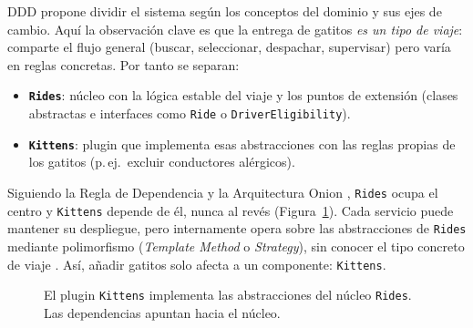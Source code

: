 DDD propone dividir el sistema según los conceptos del dominio y sus ejes de
cambio. Aquí la observación clave es que la entrega de gatitos \emph{es un tipo
de viaje}: comparte el flujo general (buscar, seleccionar, despachar,
supervisar) pero varía en reglas concretas. Por tanto se separan:

\begin{itemize}[nosep]
  \item \textbf{\texttt{Rides}}: núcleo con la lógica estable del viaje y los
        puntos de extensión (clases abstractas e interfaces como \texttt{Ride} o
        \texttt{DriverEligibility}).
  \item \textbf{\texttt{Kittens}}: plugin que implementa esas abstracciones con
        las reglas propias de los gatitos (p.\,ej.\ excluir conductores
        alérgicos).
\end{itemize}

Siguiendo la Regla de Dependencia \parencite{martin2017} y la Arquitectura Onion
\parencite{palermo2008}, \texttt{Rides} ocupa el centro y \texttt{Kittens}
depende de él, nunca al revés (Figura~\ref{fig:p5-plugins}). Cada servicio puede
mantener su despliegue, pero internamente opera sobre las abstracciones de
\texttt{Rides} mediante polimorfismo (\textit{Template Method} o
\textit{Strategy}), sin conocer el tipo concreto de viaje \parencite{martin2017}.
Así, añadir gatitos solo afecta a un componente: \texttt{Kittens}.

\begin{figure}[ht]
\centering
{}
\caption{El plugin \texttt{Kittens} implementa las abstracciones del núcleo
\texttt{Rides}. Las dependencias apuntan hacia el núcleo.}
\label{fig:p5-plugins}
\end{figure}

